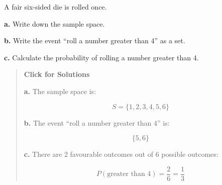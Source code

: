 \documentclass[
  letterpaper,
  DIV=11,
  numbers=noendperiod]{scrreprt}
\begin{document}
\begin{tcolorbox}[enhanced jigsaw, arc=.35mm, bottomrule=.15mm, bottomtitle=1mm, breakable, colback=white, colbacktitle=quarto-callout-note-color!10!white, colframe=quarto-callout-note-color-frame, coltitle=black, left=2mm, leftrule=.75mm, opacityback=0, opacitybacktitle=0.6, rightrule=.15mm, title=\textcolor{quarto-callout-note-color}{\faInfo}\hspace{0.5em}{Question 1}, titlerule=0mm, toprule=.15mm, toptitle=1mm]

A fair six-sided die is rolled once.

\textbf{a.} Write down the sample space.

\textbf{b.} Write the event ``roll a number greater than 4'' as a set.

\textbf{c.} Calculate the probability of rolling a number greater than
4.

\begin{quote}
\textbf{Click for Solutions}

\textbf{a.} The sample space is:

\[
S = \{1,2,3,4,5,6\}
\]

\textbf{b.} The event ``roll a number greater than 4'' is:

\[
\{5,6\}
\]

\textbf{c.} There are 2 favourable outcomes out of 6 possible outcomes:

\[
P(\text{greater than 4}) = \frac{2}{6} = \frac{1}{3}
\]
\end{quote}

\end{tcolorbox}
\end{document}
